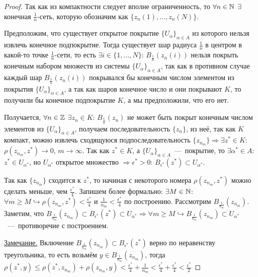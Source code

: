 \begin{proof}
    Так как из компактности следует вполне ограниченность, то $\forall n \in \mathbb{N}$ $\exists$ конечная $\frac{1}{n}$-сеть, которую обозначим как $\{ z_{n} (1), \ldots, z_{n} (N)\}$.

    Предположим, что существует открытое покрытие $\{ U_{\alpha}\}_{\alpha \in A}$ из которого нельзя извлечь конечное подпокрытие. Тогда существует шар радиуса $\frac{1}{n}$ в центром в какой-то точке $\frac{1}{n}$-сети, то есть $\exists i \in \{ 1, \ldots, N\}$: $B_{\frac{1}{n}} (z_{n} (i))$ нельзя покрыть конечным набором множеств из системы $\{ U_{\alpha}\}_{\alpha \in A}$, так как в противном случае каждый шар $B_{\frac{1}{n}} (z_{n} (i))$ покрывался бы конечным числом элементом из покрытия $\{U_{\alpha}\}_{\alpha \in A}$, а так как шаров конечное число и они покрывают $K$, то получили бы конечное подпокрытие $K$, а мы предположили, что его нет.

    Получается, $\forall n \in \mathbb{Z}$ $\exists z_{n} \in K$: $B_{\frac{1}{n}} (z_{n})$ не может быть покрыт конечным числом элементов из $\{ U_{\alpha}\}_{\alpha \in A}$, получаем последовательность $\{ z_{n}\}$, из неё, так как $K$ компакт, можно извлечь сходящуюся подпоследовательность $\{ z_{n_{m}}\} \Rightarrow \exists z^{*} \in K$: $\rho(z_{n_{m}}, z^{*})\to 0$, $m\to \infty$. Так как $z^{*} \in K$, а $\{ U_{\alpha}\}_{\alpha \in A}$~---~покрытие, то $\exists \alpha^{*} \in A$: $z^{*} \in U_{\alpha^{*}}$, но $U_{\alpha^{*}}$ открытое множество $\Rightarrow \epsilon^{*} > 0$: $B_{\epsilon^{*}} (z^{*}) \subset U_{\alpha^{*}}$. 
    
    Так как $\{ z_{n_{m}}\}$ сходится к $z^{*}$, то начиная с некоторого номера $\rho(z_{n_m}, z^{*})$ можно сделать меньше, чем $\frac{\epsilon^*}{4}$. Запишем более формально: $\exists M \in \mathbb{N}$: $\forall m \geq M \hookrightarrow \rho(z_{n_m}, z^*) < \frac{\epsilon^{*}}{4}$ и $\frac{1}{n_m} < \frac{\epsilon^{*}}{4}$ по построению. Рассмотрим $\displaystyle B_{\frac{1}{n_m}} (z_{n_m})$. Заметим, что $\displaystyle B_{\frac{1}{n_m}} (z_{n_m}) \subset B_{\epsilon^{*}} (z^{*}) \subset U_{\alpha^{*}} \Rightarrow \forall m \geq M \hookrightarrow B_{\frac{1}{n_m}} (z_{n_m}) \subset U_{\alpha^{*}}$~---~противоречие с построением.

    \underline{Замечание.} Включение $\displaystyle B_{\frac{1}{n_m}} (z_{n_m}) \subset B_{\epsilon^{*}} (z^{*})$ верно по неравенству треугольника, то есть возьмём $\displaystyle y \in B_{\frac{1}{n_m}} (z_{n_m})$, тогда $\rho(z^{*}, y) \leq \rho(z^{*}, z_{n_m}) + \rho(z_{n_m}, y) < \frac{\epsilon^{*}}{4} + \frac{1}{n_m} < \frac{\epsilon^{*}}{4} + \frac{\epsilon^{*}}{4} < \frac{\epsilon^{*}}{2}$
\end{proof}
